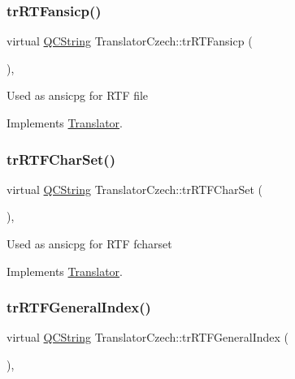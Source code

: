 \subsubsection{\texorpdfstring{trRTFansicp()}{trRTFansicp()}}
{\footnotesize\ttfamily virtual \mbox{\hyperlink{class_q_c_string}{Q\+C\+String}} Translator\+Czech\+::tr\+R\+T\+Fansicp (\begin{DoxyParamCaption}{ }\end{DoxyParamCaption})\hspace{0.3cm}{\ttfamily [inline]}, {\ttfamily [virtual]}}

Used as ansicpg for R\+TF file 

Implements \mbox{\hyperlink{class_translator_a9953a4c0e6a4fc7d017abcd5c2939e0f}{Translator}}.

\mbox{\label{class_translator_czech_a553efdc46375639c50cad98acf5203df}} 
\subsubsection{\texorpdfstring{trRTFCharSet()}{trRTFCharSet()}}
{\footnotesize\ttfamily virtual \mbox{\hyperlink{class_q_c_string}{Q\+C\+String}} Translator\+Czech\+::tr\+R\+T\+F\+Char\+Set (\begin{DoxyParamCaption}{ }\end{DoxyParamCaption})\hspace{0.3cm}{\ttfamily [inline]}, {\ttfamily [virtual]}}

Used as ansicpg for R\+TF fcharset 

Implements \mbox{\hyperlink{class_translator_afad391f3cbfb5ce6332b7239f8e2049a}{Translator}}.

\mbox{\label{class_translator_czech_ac2aa9f9d434a7f6eb4feb917d682730a}} 
\subsubsection{\texorpdfstring{trRTFGeneralIndex()}{trRTFGeneralIndex()}}
{\footnotesize\ttfamily virtual \mbox{\hyperlink{class_q_c_string}{Q\+C\+String}} Translator\+Czech\+::tr\+R\+T\+F\+General\+Index (\begin{DoxyParamCaption}{ }\end{DoxyParamCaption})\hspace{0.3cm}{\ttfamily [inline]}, {\ttfamily [virtual]}}

